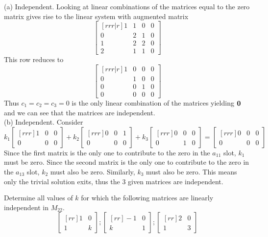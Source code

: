 \ee
\begin{solution}
\noindent (a) Independent. Looking at linear combinations of the matrices equal to the zero matrix gives rise to the linear system with augmented matrix
\[
\begin{bmatrix}[rrr|r]
1&1&0&0\\
0&2&1&0\\
1&2&2&0\\
2&1&1&0
\end{bmatrix}
\]
This row reduces to 
\[
\begin{bmatrix}[rrr|r]
1&0&0&0\\
0&1&0&0\\
0&0&1&0\\
0&0&0&0
\end{bmatrix}
\]
Thus $c_1=c_2=c_3=0$ is the only linear combination of the matrices yielding ${\mathbf 0}$ and we can see that  the matrices are independent. 
\\
(b) Independent. Consider
$$k_1
\begin{bmatrix}[rrr]
1&0&0\\
0&0&0
\end{bmatrix}
+k_2
\begin{bmatrix}[rrr]
0&0&1\\
0&0&0
\end{bmatrix}
+k_3
\begin{bmatrix}[rrr]
0&0&0\\
0&1&0
\end{bmatrix}
=
\begin{bmatrix}[rrr]
0&0&0\\
0&0&0
\end{bmatrix}
$$
Since the first matrix is the only one to contribute to the zero in the $a_{11}$ slot, $k_1$ must be zero. Since the second matrix is the only one to contribute to the zero in the $a_{13}$ slot, $k_2$ must also be zero. Similarly, $k_3$ must also be zero. This means only the trivial solution exits, thus the 3 given matrices are independent.
\end{solution}
\ii Determine all values of $k$ for which the following matrices are linearly independent in $M_{22}$.
$$
\begin{bmatrix}[rr]
1&0\\
1&k
\end{bmatrix}
;
\begin{bmatrix}[rr]
-1&0\\
k&1
\end{bmatrix}
;
\begin{bmatrix}[rr]
2&0\\
1&3
\end{bmatrix}
$$
